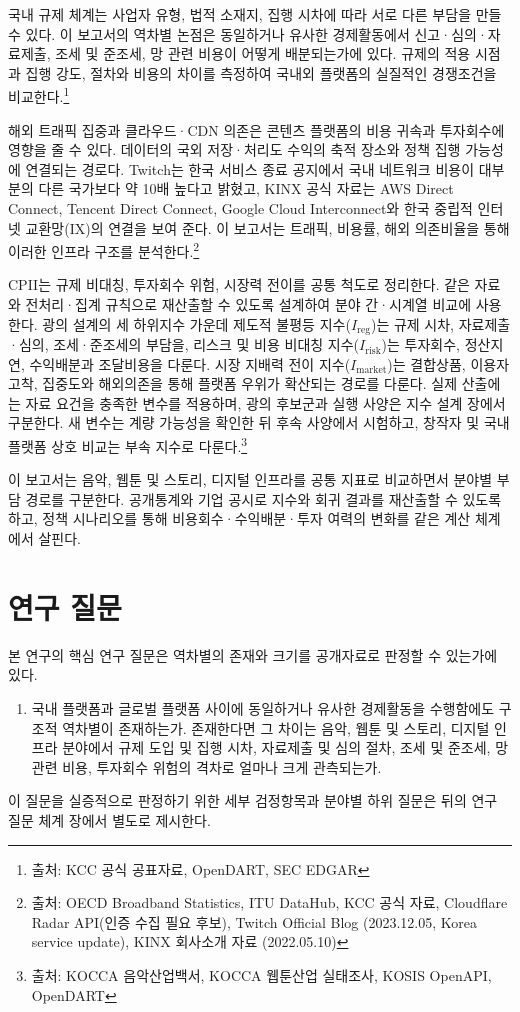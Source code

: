 \documentclass[11pt,a4paper]{report}
\newcommand{\sourcefootnote}[1]{\footnote{출처: #1}}
\newcommand{\srcTwitchKorea}{Twitch Official Blog (2023.12.05, Korea service update)}
\newcommand{\srcKINXDeck}{KINX 회사소개 자료 (2022.05.10)}
\begin{document}
국내 규제 체계는 사업자 유형, 법적 소재지, 집행 시차에 따라 서로 다른 부담을 만들 수 있다. 이 보고서의 역차별 논점은 동일하거나 유사한 경제활동에서 신고·심의·자료제출, 조세 및 준조세, 망 관련 비용이 어떻게 배분되는가에 있다. 규제의 적용 시점과 집행 강도, 절차와 비용의 차이를 측정하여 국내외 플랫폼의 실질적인 경쟁조건을 비교한다.\sourcefootnote{KCC 공식 공표자료, OpenDART, SEC EDGAR}

해외 트래픽 집중과 클라우드·CDN 의존은 콘텐츠 플랫폼의 비용 귀속과 투자회수에 영향을 줄 수 있다. 데이터의 국외 저장·처리도 수익의 축적 장소와 정책 집행 가능성에 연결되는 경로다. Twitch는 한국 서비스 종료 공지에서 국내 네트워크 비용이 대부분의 다른 국가보다 약 10배 높다고 밝혔고, KINX 공식 자료는 AWS Direct Connect, Tencent Direct Connect, Google Cloud Interconnect와 한국 중립적 인터넷 교환망(IX)의 연결을 보여 준다. 이 보고서는 트래픽, 비용률, 해외 의존비율을 통해 이러한 인프라 구조를 분석한다.\sourcefootnote{OECD Broadband Statistics, ITU DataHub, KCC 공식 자료, Cloudflare Radar API(인증 수집 필요 후보), \srcTwitchKorea, \srcKINXDeck}

CPII는 규제 비대칭, 투자회수 위험, 시장력 전이를 공통 척도로 정리한다. 같은 자료와 전처리·집계 규칙으로 재산출할 수 있도록 설계하여 분야 간·시계열 비교에 사용한다. 광의 설계의 세 하위지수 가운데 제도적 불평등 지수($I_{\mathrm{reg}}$)는 규제 시차, 자료제출·심의, 조세·준조세의 부담을, 리스크 및 비용 비대칭 지수($I_{\mathrm{risk}}$)는 투자회수, 정산지연, 수익배분과 조달비용을 다룬다. 시장 지배력 전이 지수($I_{\mathrm{market}}$)는 결합상품, 이용자 고착, 집중도와 해외의존을 통해 플랫폼 우위가 확산되는 경로를 다룬다. 실제 산출에는 자료 요건을 충족한 변수를 적용하며, 광의 후보군과 실행 사양은 지수 설계 장에서 구분한다. 새 변수는 계량 가능성을 확인한 뒤 후속 사양에서 시험하고, 창작자 및 국내 플랫폼 상호 비교는 부속 지수로 다룬다.\sourcefootnote{KOCCA 음악산업백서, KOCCA 웹툰산업 실태조사, KOSIS OpenAPI, OpenDART}

이 보고서는 음악, 웹툰 및 스토리, 디지털 인프라를 공통 지표로 비교하면서 분야별 부담 경로를 구분한다. 공개통계와 기업 공시로 지수와 회귀 결과를 재산출할 수 있도록 하고, 정책 시나리오를 통해 비용회수·수익배분·투자 여력의 변화를 같은 계산 체계에서 살핀다.

\section{연구 질문}
본 연구의 핵심 연구 질문은 역차별의 존재와 크기를 공개자료로 판정할 수 있는가에 있다.
\begin{enumerate}[label=\arabic*.]
  \item 국내 플랫폼과 글로벌 플랫폼 사이에 동일하거나 유사한 경제활동을 수행함에도 구조적 역차별이 존재하는가. 존재한다면 그 차이는 음악, 웹툰 및 스토리, 디지털 인프라 분야에서 규제 도입 및 집행 시차, 자료제출 및 심의 절차, 조세 및 준조세, 망 관련 비용, 투자회수 위험의 격차로 얼마나 크게 관측되는가.
\end{enumerate}
이 질문을 실증적으로 판정하기 위한 세부 검정항목과 분야별 하위 질문은 뒤의 연구 질문 체계 장에서 별도로 제시한다.
\end{document}
